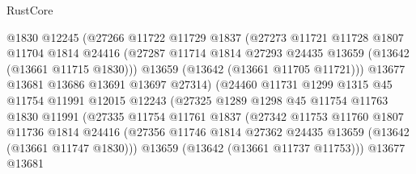 \begin{lexlean}{RustCore}
\begin{coremodule}
                          @1830
                          @12245
                          (@27266
                            @11722
                            @11729
                            @1837
                            (@27273
                              @11721
                              @11728
                              @1807
                              @11704
                              @1814
                              @24416
                              (@27287
                                @11714
                                @1814
                                @27293
                                @24435
                                @13659
                                (@13642 (@13661 @11715 @1830)))
                              @13659
                              (@13642 (@13661 @11705 @11721)))
                            @13677
                            @13681
                            @13686
                            @13691
                            @13697
                            @27314)
                          (@24460
                            @11731
                            @1299
                            @1315
                            @45
                            @11754
                            @11991
                            @12015
                            @12243
                            (@27325
                              @1289
                              @1298
                              @45
                              @11754
                              @11763
                              @1830
                              @11991
                              (@27335
                                @11754
                                @11761
                                @1837
                                (@27342
                                  @11753
                                  @11760
                                  @1807
                                  @11736
                                  @1814
                                  @24416
                                  (@27356
                                    @11746
                                    @1814
                                    @27362
                                    @24435
                                    @13659
                                    (@13642 (@13661 @11747 @1830)))
                                  @13659
                                  (@13642 (@13661 @11737 @11753)))
                                @13677
                                @13681

\end{coremodule}
\end{lexlean}
